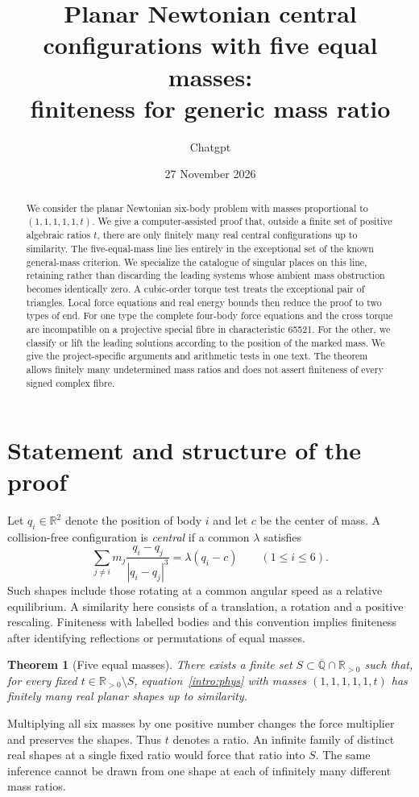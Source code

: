 \documentclass[11pt,letterpaper]{article}
\title{Planar Newtonian central configurations with five equal masses:\\ finiteness for generic mass ratio}
\author{Chatgpt}
\date{27 November 2026}
\newtheorem{theorem}{Theorem}[section]
\theoremstyle{definition}
\newcommand{\Q}{\mathbb{Q}}
\newcommand{\R}{\mathbb{R}}
\begin{document}
\maketitle
\begin{abstract}
We consider the planar Newtonian six-body problem with masses proportional to $(1,1,1,1,1,t)$. We give a computer-assisted proof that, outside a finite set of positive algebraic ratios $t$, there are only finitely many real central configurations up to similarity. The five-equal-mass line lies entirely in the exceptional set of the known general-mass criterion. We specialize the catalogue of singular places on this line, retaining rather than discarding the leading systems whose ambient mass obstruction becomes identically zero. A cubic-order torque test treats the exceptional pair of triangles. Local force equations and real energy bounds then reduce the proof to two types of end. For one type the complete four-body force equations and the cross torque are incompatible on a projective special fibre in characteristic 65521. For the other, we classify or lift the leading solutions according to the position of the marked mass. We give the project-specific arguments and arithmetic tests in one text. The theorem allows finitely many undetermined mass ratios and does not assert finiteness of every signed complex fibre.
\end{abstract}

\section{Statement and structure of the proof}
Let $q_i\in\R^2$ denote the position of body $i$ and let $c$ be the center of mass. A collision-free configuration is \emph{central} if a common $\lambda$ satisfies
\begin{equation}\label{intro:phys}
 \sum_{j\ne i}m_j\frac{q_i-q_j}{|q_i-q_j|^3}=\lambda(q_i-c)
 \qquad (1\le i\le6).
\end{equation}
Such shapes include those rotating at a common angular speed as a relative equilibrium. A similarity here consists of a translation, a rotation and a positive rescaling. Finiteness with labelled bodies and this convention implies finiteness after identifying reflections or permutations of equal masses.
\begin{theorem}[Five equal masses]\label{intro:main}
There exists a finite set $S\subset\overline{\Q}\cap\R_{>0}$ such that, for every fixed $t\in\R_{>0}\setminus S$, equation~\eqref{intro:phys} with masses $(1,1,1,1,1,t)$ has finitely many real planar shapes up to similarity.
\end{theorem}
Multiplying all six masses by one positive number changes the force multiplier and preserves the shapes. Thus $t$ denotes a ratio. An infinite family of distinct real shapes at a single fixed ratio would force that ratio into $S$. The same inference cannot be drawn from one shape at each of infinitely many different mass ratios.
\end{document}
